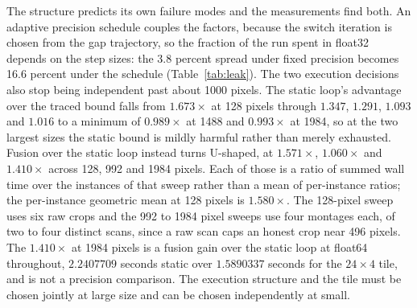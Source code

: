 The structure predicts its own failure modes and the measurements find both. An
adaptive precision schedule couples the factors, because the switch iteration is
chosen from the gap trajectory, so the fraction of the run spent in float32
depends on the step sizes: the 3.8 percent spread under fixed precision becomes
16.6 percent under the schedule (Table~\ref{tab:leak}). The two execution
decisions also stop being independent past about 1000 pixels. The static loop's
advantage over the traced bound falls from $1.673\times$ at 128 pixels through
$1.347$, $1.291$, $1.093$ and $1.016$ to a minimum of $0.989\times$ at 1488 and
$0.993\times$ at 1984, so at the two largest sizes the static bound is mildly
harmful rather than merely exhausted. Fusion over the static loop instead turns
U-shaped, at $1.571\times$, $1.060\times$ and $1.410\times$ across 128, 992 and
1984 pixels. Each of those is a ratio of summed wall time over the instances of
that sweep rather than a mean of per-instance ratios; the per-instance geometric
mean at 128 pixels is $1.580\times$. The 128-pixel sweep uses six raw crops and
the 992 to 1984 pixel sweeps use four montages each, of two to four distinct
scans, since a raw scan caps an honest crop near 496 pixels. The $1.410\times$
at 1984 pixels is a fusion gain over the static loop at float64 throughout,
$2.2407709$ seconds static over $1.5890337$ seconds for the $24 \times 4$ tile,
and is not a precision comparison. The execution structure and the tile must be
chosen jointly at large size and can be chosen independently at small.

